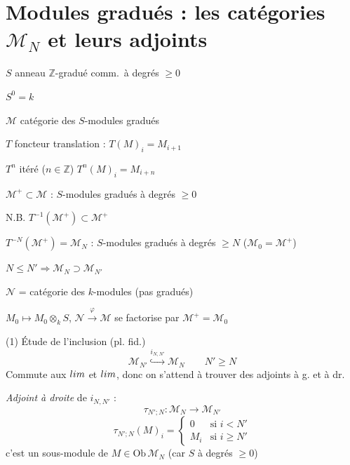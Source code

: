 \documentclass[11pt,a4paper]{article}
\begin{document}
\section{Modules gradués : les catégories $\mathcal{M}_N$ et leurs adjoints}


$S$ anneau $\mathbb{Z}$-gradué comm.\ à degrés $\geq 0$

$S^0 = k$

$\mathcal{M}$ catégorie des $S$-modules gradués

$T$ foncteur translation : $T(M)_i = M_{i+1}$ 

$T^n$ itéré ($n \in \mathbb{Z}$) \quad $T^n(M)_i = M_{i+n}$

$\mathcal{M}^+ \subset \mathcal{M}$ : $S$-modules gradués à degrés $\geq 0$

N.B. $T^{-1}(\mathcal{M}^+) \subset \mathcal{M}^+$

$T^{-N}(\mathcal{M}^+) = \mathcal{M}_N$ : $S$-modules gradués à degrés $\geq N$ ($\mathcal{M}_0 = \mathcal{M}^+$)

$N \leq N' \Longrightarrow \mathcal{M}_N \supset \mathcal{M}_{N'}$

$\mathcal{N}$ = catégorie des $k$-modules (pas gradués)

$M_0 \longmapsto M_0 \otimes_k S$, \quad $\mathcal{N} \xrightarrow{\varphi} \mathcal{M}$ se factorise par $\mathcal{M}^+ = \mathcal{M}_0$

(1) Étude de l'inclusion (pl. fid.)
\[
  \mathcal{M}_{N'} \overset{i_{N,N'}}{\hookrightarrow} \mathcal{M}_N \qquad N' \geq N
\]
Commute aux $\varinjlim$ et $\varprojlim$, donc on s'attend à trouver des adjoints à g. et à dr.

\emph{Adjoint à droite}  de $i_{N,N'}$ :
\[
  \tau_{N';N} : \mathcal{M}_N \longrightarrow \mathcal{M}_{N'}
\]
\[
  \tau_{N';N}(M)_i =
  \begin{cases}
    0 & \text{si } i < N' \\
    M_i & \text{si } i \geq N'
  \end{cases}
\]
c'est un sous-module de $M \in \mathrm{Ob}\,\mathcal{M}_N$ (car $S$ à degrés $\geq 0$)
\end{document}
